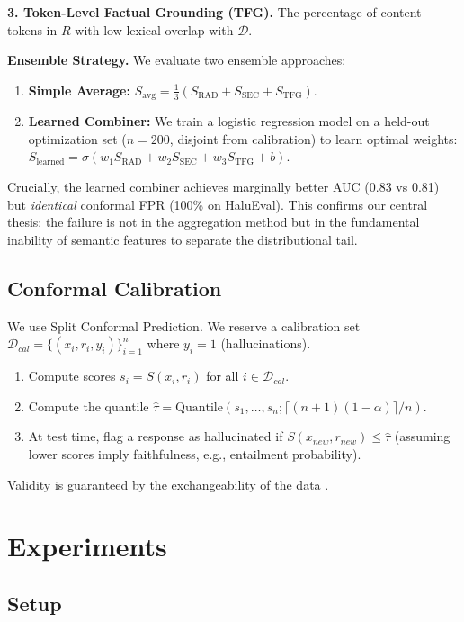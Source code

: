 \documentclass[11pt]{article}
\begin{document}
\textbf{3. Token-Level Factual Grounding (TFG).} The percentage of content tokens in $R$ with low lexical overlap with $\mathcal{D}$.

\textbf{Ensemble Strategy.} We evaluate two ensemble approaches:
\begin{enumerate}
    \item \textbf{Simple Average:} $S_{\text{avg}} = \frac{1}{3}(S_{\text{RAD}} + S_{\text{SEC}} + S_{\text{TFG}})$.
    \item \textbf{Learned Combiner:} We train a logistic regression model on a held-out optimization set ($n=200$, disjoint from calibration) to learn optimal weights: $S_{\text{learned}} = \sigma(w_1 S_{\text{RAD}} + w_2 S_{\text{SEC}} + w_3 S_{\text{TFG}} + b)$.
\end{enumerate}
Crucially, the learned combiner achieves marginally better AUC (0.83 vs 0.81) but \textit{identical} conformal FPR (100\% on HaluEval). This confirms our central thesis: the failure is not in the aggregation method but in the fundamental inability of semantic features to separate the distributional tail.

\subsection{Conformal Calibration}

We use Split Conformal Prediction. We reserve a calibration set $\mathcal{D}_{cal} = \{(x_i, r_i, y_i)\}_{i=1}^n$ where $y_i=1$ (hallucinations).
\begin{enumerate}
    \item Compute scores $s_i = S(x_i, r_i)$ for all $i \in \mathcal{D}_{cal}$.
    \item Compute the quantile $\hat{\tau} = \text{Quantile}(s_1, \dots, s_n; \lceil (n+1)(1-\alpha) \rceil / n)$.
    \item At test time, flag a response as hallucinated if $S(x_{new}, r_{new}) \leq \hat{\tau}$ (assuming lower scores imply faithfulness, e.g., entailment probability).
\end{enumerate}
Validity is guaranteed by the exchangeability of the data \cite{vovk2005algorithmic}.

\section{Experiments}

\subsection{Setup}
\end{document}
